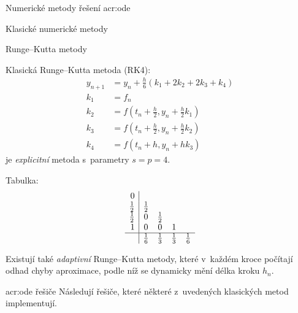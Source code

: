 \documentclass[thesis=M,czech]{FITthesis}[2012/06/26]
\newcommand{\acrlabel}[1]{acr:#1}
\newcommand{\acr}[1]{\acrshort{\acrlabel{#1}}}
\newcommand{\hl}[1]{\textit{#1}}
\begin{document}
\begin{section}{Numerické metody řešení \acr{ode}}
\begin{subsection}{Klasické numerické metody}
\begin{subsubsection}{Runge--Kutta metody}
\begin{paragraph}{Klasická Runge--Kutta metoda (RK4):}
\label{sss:search:ode:classic:rk:rk4}
\begin{equation}\label{eq:ode:rk:rk4}
\begin{split}
   y_{n+1} &= y_{n} + \frac{h}{6} ( k_1 + 2 k_2 + 2 k_3 + k_4 ) \\
   k_1     &= f_n \\
   k_2     &= f \! \left( t_n + \frac{h}{2}, y_n + \frac{h}{2} k_1 \right) \\
   k_3     &= f \! \left( t_n + \frac{h}{2}, y_n + \frac{h}{2} k_2 \right) \\
   k_4     &= f \! \left( t_n + h, y_n + h k_3 \right)
\end{split}
\end{equation}
je \hl{explicitní} metoda s~parametry ${s = p = 4}$.

Tabulka:
\begin{equation*}
\begin{array}{r|cccc}
             0  &             &             &             &             \\
   \frac{1}{2}  & \frac{1}{2} &             &             &             \\
   \frac{1}{2}  &           0 & \frac{1}{2} &             &             \\
             1  &           0 &           0 &           1 &             \\
\hline
                & \frac{1}{6} & \frac{1}{3} & \frac{1}{3} & \frac{1}{6}
\end{array}
\end{equation*}
\end{paragraph} %


\bigskip

Existují také \hl{adaptivní} Runge--Kutta metody,
které v~každém kroce počítají odhad chyby aproximace,
podle níž se dynamicky mění délka kroku $h_n$.
\end{subsubsection} %


\begin{subsubsection}{\acr{ode} řešiče}\label{sss:search:ode:classic:solver}
Následují řešiče, které některé z~uvedených klasických metod implementují.



\end{subsubsection}
\end{subsection}
\end{section}
\end{document}
